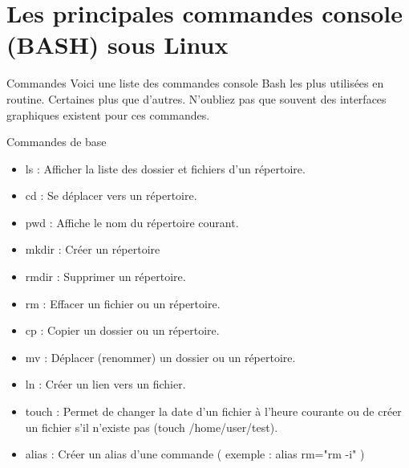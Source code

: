 \documentclass[10pt]{beamer}
\begin{document}
\section{Les principales commandes console (BASH) sous Linux}
\begin{frame}{Commandes}
Voici une liste des commandes console Bash les plus utilisées en routine. Certaines
plus que d'autres. N'oubliez pas que souvent des interfaces graphiques existent
pour ces commandes.
\end{frame}
\begin{frame}{Commandes de base }
\begin{itemize}
\item \alert{ls} : Afficher la liste des dossier et fichiers d'un répertoire.
\item \alert{cd} : Se déplacer vers un répertoire.
\item \alert{pwd} : Affiche le nom du répertoire courant.
\item \alert{mkdir} : Créer un répertoire
\item \alert{rmdir} : Supprimer un répertoire.
\item \alert{rm} : Effacer un fichier ou un répertoire.
\item \alert{cp} : Copier un dossier ou un répertoire.
\item \alert{mv} : Déplacer (renommer) un dossier ou un répertoire.
\item \alert{ln} : Créer un lien vers un fichier.
\item \alert{touch} : Permet de changer la date d'un fichier à l'heure courante ou de créer un fichier s'il n'existe pas (touch /home/user/test).
\item \alert{alias} : Créer un alias d'une commande ( exemple : alias rm="rm -i" )
\end{itemize}
\end{frame}
\end{document}
